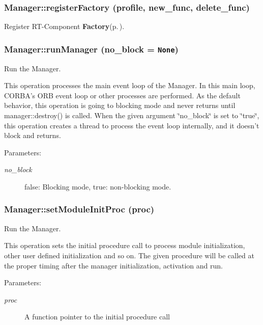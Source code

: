 \subsubsection{\setlength{\rightskip}{0pt plus 5cm}Manager::register\-Factory (profile, new\_\-func, delete\_\-func)}\label{classManager_Managera12}


Register RT-Component {\bf Factory}{\rm (p.\,\pageref{namespaceFactory})}. 

\subsubsection{\setlength{\rightskip}{0pt plus 5cm}Manager::run\-Manager (no\_\-block = {\tt None})}\label{classManager_Managera6}


Run the Manager. 

This operation processes the main event loop of the Manager. In this main loop, CORBA's ORB event loop or other processes are performed. As the default behavior, this operation is going to blocking mode and never returns until manager::destroy() is called. When the given argument \char`\"{}no\_\-block\char`\"{} is set to \char`\"{}true\char`\"{}, this operation creates a thread to process the event loop internally, and it doesn't block and returns. \begin{Desc}
\item[Parameters:]
\begin{description}
\item[{\em no\_\-block}]false: Blocking mode, true: non-blocking mode.\end{description}
\end{Desc}
\subsubsection{\setlength{\rightskip}{0pt plus 5cm}Manager::set\-Module\-Init\-Proc (proc)}\label{classManager_Managera4}


Run the Manager. 

This operation sets the initial procedure call to process module initialization, other user defined initialization and so on. The given procedure will be called at the proper timing after the manager initialization, activation and run. \begin{Desc}
\item[Parameters:]
\begin{description}
\item[{\em proc}]A function pointer to the initial procedure call\end{description}
\end{Desc}
